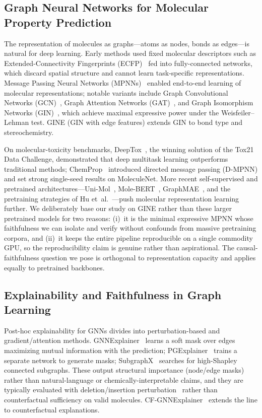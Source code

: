 \documentclass[a4paper,fleqn]{cas-dc}
\begin{document}
\subsection{Graph Neural Networks for Molecular Property Prediction}
The representation of molecules as graphs---atoms as nodes, bonds as edges---is natural for deep learning. Early methods used fixed molecular descriptors such as Extended-Connectivity Fingerprints (ECFP)~\cite{rogers2010extended} fed into fully-connected networks, which discard spatial structure and cannot learn task-specific representations. Message Passing Neural Networks (MPNNs)~\cite{gilmer2017neural} enabled end-to-end learning of molecular representations; notable variants include Graph Convolutional Networks (GCN)~\cite{kipf2017semi}, Graph Attention Networks (GAT)~\cite{velivckovic2018graph}, and Graph Isomorphism Networks (GIN)~\cite{xu2019powerful}, which achieve maximal expressive power under the Weisfeiler--Lehman test. GINE (GIN with edge features) extends GIN to bond type and stereochemistry.

On molecular-toxicity benchmarks, DeepTox~\cite{mayr2016deeptox}, the winning solution of the Tox21 Data Challenge, demonstrated that deep multitask learning outperforms traditional methods; ChemProp~\cite{yang2019analyzing} introduced directed message passing (D-MPNN) and set strong single-seed results on MoleculeNet. More recent self-supervised and pretrained architectures---Uni-Mol~\cite{zhou2022unimol}, Mole-BERT~\cite{xia2023molebert}, GraphMAE~\cite{zhang2022graphmae}, and the pretraining strategies of Hu et~al.~\cite{hu2020strategies}---push molecular representation learning further. We deliberately base our study on GINE rather than these larger pretrained models for two reasons: (i)~it is the minimal expressive MPNN whose faithfulness we can isolate and verify without confounds from massive pretraining corpora, and (ii)~it keeps the entire pipeline reproducible on a single commodity GPU, so the reproducibility claim is genuine rather than aspirational. The causal-faithfulness question we pose is orthogonal to representation capacity and applies equally to pretrained backbones.

\subsection{Explainability and Faithfulness in Graph Learning}
Post-hoc explainability for GNNs divides into perturbation-based and gradient/attention methods. GNNExplainer~\cite{ying2019gnnexplainer} learns a soft mask over edges maximizing mutual information with the prediction; PGExplainer~\cite{luo2020parameterized} trains a separate network to generate masks; SubgraphX~\cite{yuan2021explainability} searches for high-Shapley connected subgraphs. These output structural importance (node/edge masks) rather than natural-language or chemically-interpretable claims, and they are typically evaluated with deletion/insertion perturbation~\cite{deyoung2020eraser} rather than counterfactual sufficiency on valid molecules. CF-GNNExplainer~\cite{lucic2022cfgnnexplainer} extends the line to counterfactual explanations.
\end{document}
